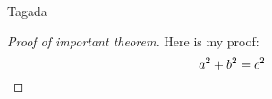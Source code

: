 
\ifdefined\COMPLETE
\else
    
    \usepackage{alterqcm}
    
    
    
\fi


Tagada

\begin{proof} [Proof of important theorem]

\bigskip 

Here is my proof:
\[
a^2 + b^2 = c^2 \qedhere
\]
\end{proof}

\ifdefined\COMPLETE
\else
    
\fi

